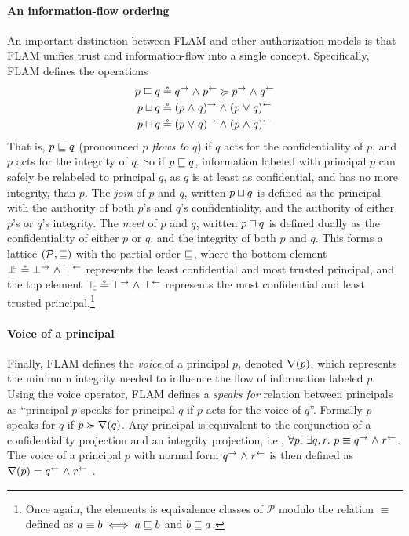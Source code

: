 \paragraph{An information-flow ordering}
An important distinction between FLAM and other authorization models is that FLAM unifies trust and information-flow into a single concept. Specifically, FLAM defines the operations
\begin{align}
\label{eq:flam-flowsto-from-actsfor} p \flowsto q &\circeq \conf{q} \conj \integ{p} \actsfor \conf{p} \conj \integ{q}\\
p \join q &\circeq \conf{(p \conj q)} \conj \integ{(p \disj q)} \\
p \meet q &\circeq \conf{(p \disj q)} \conj \integ{(p \conj q)}
\end{align}
That is, $p \sqsubseteq q$ (pronounced $p$ \emph{flows to} $q$) if $q$ acts for the confidentiality of $p$, and $p$ acts for the integrity of $q$. So if $p \sqsubseteq q$, information labeled with principal $p$ can safely be relabeled to principal $q$, as $q$ is at least as confidential, and has no more integrity, than $p$. The \emph{join} of $p$ and $q$, written $p \sqcup q$ is defined as the principal with the authority of both $p$'s and $q$'s confidentiality, and the authority of either $p$'s or $q$'s integrity. The \emph{meet} of $p$ and $q$, written $p \sqcap q$ is defined dually as the confidentiality of either $p$ or $q$, and the integrity of both $p$ and $q$.
This forms a lattice $(\mathcal{P}, \sqsubseteq)$ with the partial order $\sqsubseteq$, where the bottom element $\botinfoflow \circeq \conf{\bot} \conj \integ{\top}$ represents the least confidential and most trusted principal, and the top element $\topinfoflow \circeq \conf{\top} \conj \integ{\bot}$ represents the most confidential and least trusted principal.\footnote{Once again, the elements is equivalence classes of $\mathcal{P}$ modulo the relation $\equiv$ defined as $a \equiv b \iff a \sqsubseteq b$ and $b \sqsubseteq a$.}

\paragraph{Voice of a principal}
Finally, FLAM defines the \emph{voice} of a principal $p$, denoted $\nabla(p)$, which represents the minimum integrity needed to influence the flow of information labeled $p$. Using the voice operator, FLAM defines a \emph{speaks for} relation \cite{Lampson:1992:ADS:138873.138874, Abadi:2006:ACC:1159803.1159839} between principals as ``principal $p$ speaks for principal $q$ if $p$ acts for the voice of $q$''. Formally $p$ speaks for $q$ if $p \succcurlyeq \nabla(q)$. Any principal is equivalent to the conjunction of a confidentiality projection and an integrity projection, i.e., $\forall p.~ \exists q, r.~ p \equiv q^{\rightarrow} \mathrel{\land} r^{\leftarrow}$. The voice of a principal $p$ with normal form $q^{\rightarrow} \mathrel{\land} r^{\leftarrow}$ is then defined as $\nabla(p) = q^{\leftarrow} \mathrel{\land} r^{\leftarrow}$ \cite{Arden:2015:FA:2859845.2859998}.

